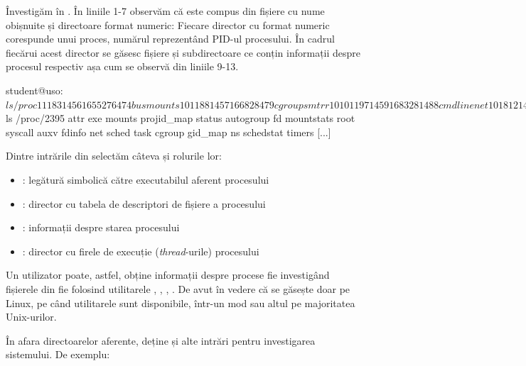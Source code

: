 Învestigăm  în . În liniile 1-7
observăm că  este compus din fișiere cu nume obișnuite și directoare format numeric:
Fiecare director cu format numeric corespunde unui proces, numărul reprezentând
PID-ul procesului. În cadrul fiecărui acest director se găsesc fișiere și
subdirectoare ce conțin informații despre procesul respectiv așa cum se observă din liniile 9-13.

\begin{screen}[caption={Informații din /proc},label={lst:process:proc}]
student@uso:~$ ls /proc
1      1183   1456   1655  276   474        bus          mounts
10     1188   1457   1668  28    479        cgroups      mtrr
1010   1197   1459   1683  281   488        cmdline      net
1018   12     14636  17    284   493        consoles     pagetypeinfo
1019   1202   1464   1742  287   496        cpuinfo      partitions
1032   1205   1467   176   288   498        crypto       sched_debug
[...]
student@uso:~$ ls /proc/2395
attr             exe        mounts         projid_map    status
autogroup        fd         mountstats     root          syscall
auxv             fdinfo     net            sched         task
cgroup           gid_map    ns             schedstat     timers
[...]
\end{screen}

Dintre intrările din  selectăm câteva și rolurile lor:

\begin{itemize}
  \item {}: legătură simbolică către executabilul aferent procesului
  \item {}: director cu tabela de descriptori de fișiere a procesului
  \item {}: informații despre starea procesului
  \item {}: director cu firele de execuție (\textit{thread}-urile) procesului
\end{itemize}

Un utilizator poate, astfel, obține informații despre procese fie investigând
fișierele din  fie folosind utilitarele , , , . De avut în
vedere că  se găsește doar pe Linux, pe când utilitarele sunt disponibile,
într-un mod sau altul pe majoritatea Unix-urilor.

În afara directoarelor aferente,  deține și alte intrări pentru investigarea sistemului. De exemplu:

